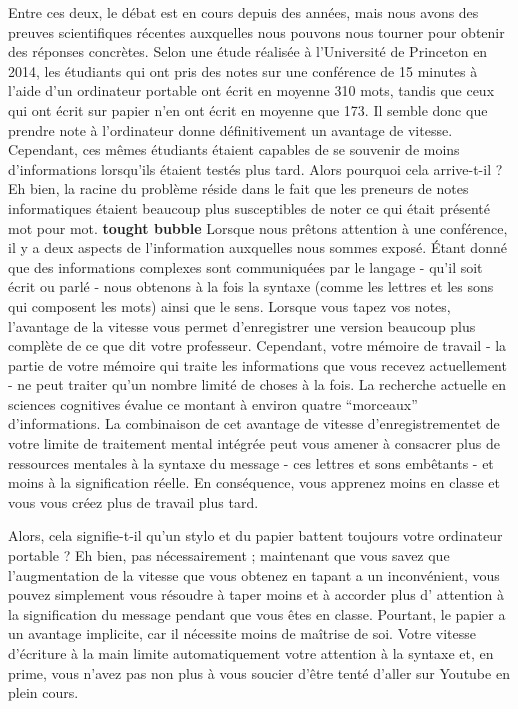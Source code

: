 Entre ces deux, le débat est en
cours depuis des années, mais nous avons des preuves scientifiques
récentes auxquelles nous pouvons nous tourner pour obtenir des réponses
concrètes. Selon une étude réalisée à l'Université de Princeton en 2014,
les étudiants qui ont pris des notes sur une conférence de 15 minutes à
l'aide d'un ordinateur portable ont écrit en moyenne 310 mots, tandis
que ceux qui ont écrit sur papier n'en ont écrit en moyenne que 173. Il
semble donc que prendre note à l'ordinateur donne définitivement un
avantage de vitesse. Cependant, ces mêmes étudiants étaient capables de
se souvenir de moins d'informations lorsqu'ils étaient testés plus tard.
Alors pourquoi cela arrive-t-il ? Eh bien, la racine du problème réside
dans le fait que les preneurs de notes informatiques étaient beaucoup
plus susceptibles de noter ce qui était présenté mot pour mot.
\textbf{tought bubble} Lorsque nous prêtons attention à une conférence,
il y a deux aspects de l'information auxquelles nous sommes exposé.
Étant donné que des informations complexes sont communiquées par le
langage - qu'il soit écrit ou parlé - nous obtenons à la fois la syntaxe
(comme les lettres et les sons qui composent les mots) ainsi que le
sens. Lorsque vous tapez vos notes, l'avantage de la vitesse vous permet
d'enregistrer une version beaucoup plus complète de ce que dit votre
professeur. Cependant, votre mémoire de travail - la partie de votre
mémoire qui traite les informations que vous recevez actuellement - ne
peut traiter qu'un nombre limité de choses à la fois. La recherche
actuelle en sciences cognitives évalue ce montant à environ quatre
``morceaux'' d'informations. La combinaison de cet avantage de vitesse
d'enregistrementet de votre limite de traitement mental intégrée peut
vous amener à consacrer plus de ressources mentales à la syntaxe du
message - ces lettres et sons embêtants - et moins à la signification
réelle. En conséquence, vous apprenez moins en classe et vous vous créez
plus de travail plus tard.

Alors, cela signifie-t-il qu'un stylo et du papier battent toujours
votre ordinateur portable ? Eh bien, pas nécessairement ; maintenant que
vous savez que l'augmentation de la vitesse que vous obtenez en tapant a
un inconvénient, vous pouvez simplement vous résoudre à taper moins et à
accorder plus d' attention à la signification du message pendant que
vous êtes en classe. Pourtant, le papier a un avantage implicite, car il
nécessite moins de maîtrise de soi. Votre vitesse d'écriture à la main
limite automatiquement votre attention à la syntaxe et, en prime, vous
n'avez pas non plus à vous soucier d'être tenté d'aller sur Youtube en
plein cours.

